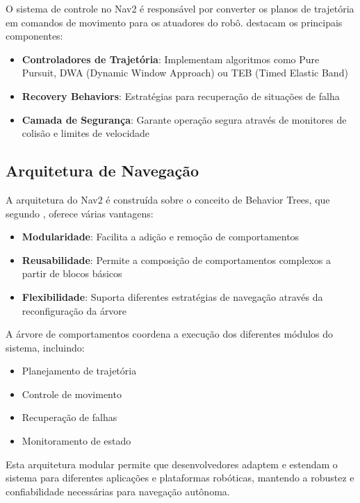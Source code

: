 O sistema de controle no Nav2 é responsável por converter os planos de
trajetória em comandos de movimento para os atuadores do robô.
\cite{Stachowicz2023FastRLAP} destacam os principais componentes:

\begin{itemize}
    \item \textbf{Controladores de Trajetória}: Implementam algoritmos como Pure Pursuit, DWA (Dynamic Window Approach) ou TEB (Timed Elastic Band)
    \item \textbf{Recovery Behaviors}: Estratégias para recuperação de situações de falha
    \item \textbf{Camada de Segurança}: Garante operação segura através de monitores de colisão e limites de velocidade
\end{itemize}

\subsection{Arquitetura de Navegação}

A arquitetura do Nav2 é construída sobre o conceito de Behavior Trees, que
segundo \cite{Ivanov2020Verifying}, oferece várias vantagens:

\begin{itemize}
    \item \textbf{Modularidade}: Facilita a adição e remoção de comportamentos
    \item \textbf{Reusabilidade}: Permite a composição de comportamentos complexos a partir de blocos básicos
    \item \textbf{Flexibilidade}: Suporta diferentes estratégias de navegação através da reconfiguração da árvore
\end{itemize}

A árvore de comportamentos coordena a execução dos diferentes módulos do
sistema, incluindo:
\begin{itemize}
    \item Planejamento de trajetória
    \item Controle de movimento
    \item Recuperação de falhas
    \item Monitoramento de estado
\end{itemize}

Esta arquitetura modular permite que desenvolvedores adaptem e estendam o
sistema para diferentes aplicações e plataformas robóticas, mantendo a robustez
e confiabilidade necessárias para navegação autônoma.


